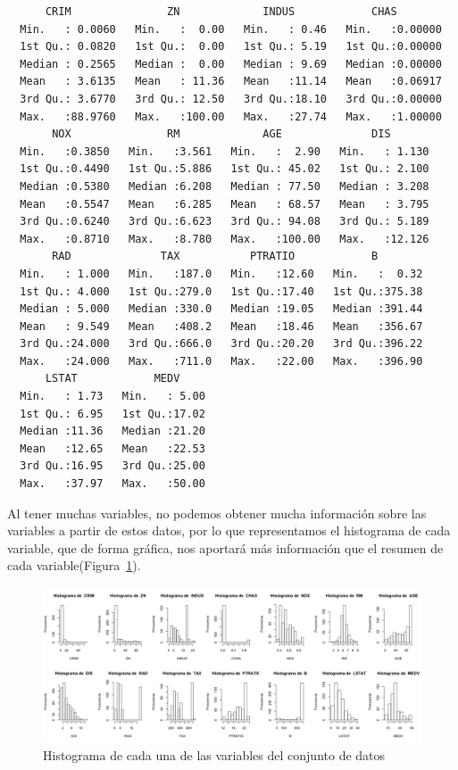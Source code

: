 \documentclass[12pt,a4paper,twoside,openright,titlepage,final]{article}
\begin{document}
\begin{verbatim}
      CRIM               ZN             INDUS            CHAS        
  Min.   : 0.0060   Min.   :  0.00   Min.   : 0.46   Min.   :0.00000  
  1st Qu.: 0.0820   1st Qu.:  0.00   1st Qu.: 5.19   1st Qu.:0.00000  
  Median : 0.2565   Median :  0.00   Median : 9.69   Median :0.00000  
  Mean   : 3.6135   Mean   : 11.36   Mean   :11.14   Mean   :0.06917  
  3rd Qu.: 3.6770   3rd Qu.: 12.50   3rd Qu.:18.10   3rd Qu.:0.00000  
  Max.   :88.9760   Max.   :100.00   Max.   :27.74   Max.   :1.00000  
       NOX               RM             AGE              DIS        
  Min.   :0.3850   Min.   :3.561   Min.   :  2.90   Min.   : 1.130  
  1st Qu.:0.4490   1st Qu.:5.886   1st Qu.: 45.02   1st Qu.: 2.100  
  Median :0.5380   Median :6.208   Median : 77.50   Median : 3.208  
  Mean   :0.5547   Mean   :6.285   Mean   : 68.57   Mean   : 3.795  
  3rd Qu.:0.6240   3rd Qu.:6.623   3rd Qu.: 94.08   3rd Qu.: 5.189  
  Max.   :0.8710   Max.   :8.780   Max.   :100.00   Max.   :12.126  
       RAD              TAX           PTRATIO            B         
  Min.   : 1.000   Min.   :187.0   Min.   :12.60   Min.   :  0.32  
  1st Qu.: 4.000   1st Qu.:279.0   1st Qu.:17.40   1st Qu.:375.38  
  Median : 5.000   Median :330.0   Median :19.05   Median :391.44  
  Mean   : 9.549   Mean   :408.2   Mean   :18.46   Mean   :356.67  
  3rd Qu.:24.000   3rd Qu.:666.0   3rd Qu.:20.20   3rd Qu.:396.22  
  Max.   :24.000   Max.   :711.0   Max.   :22.00   Max.   :396.90  
      LSTAT            MEDV      
  Min.   : 1.73   Min.   : 5.00  
  1st Qu.: 6.95   1st Qu.:17.02  
  Median :11.36   Median :21.20  
  Mean   :12.65   Mean   :22.53  
  3rd Qu.:16.95   3rd Qu.:25.00  
  Max.   :37.97   Max.   :50.00  
\end{verbatim}

Al tener muchas variables, no podemos obtener mucha información sobre las variables a partir de estos datos, por lo que representamos el histograma de cada variable, que de forma gráfica, nos aportará más información que el resumen de cada variable(Figura~\ref{fig:histogramas}).\\


\begin{figure}[tbph!]
\centering
\includegraphics[width=0.9\linewidth]{imagenes/histogramas}
\caption{Histograma de cada una de las variables del conjunto de datos}
\label{fig:histogramas}
\end{figure}
\end{document}
